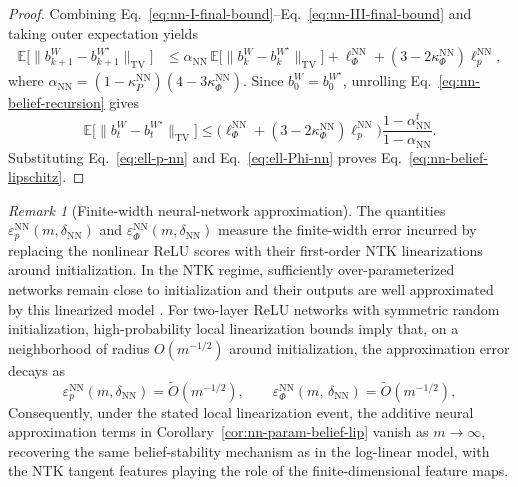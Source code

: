 \documentclass[10pt]{article} %
\theoremstyle{plain}
\theoremstyle{definition}
\theoremstyle{remark}
\newtheorem{remark}[theorem]{Remark}
\newcommand{\bE}{\mathbb{E}}
\begin{document}
\begin{proof}
Combining Eq.~\ref{eq:nn-I-final-bound}--Eq.~\ref{eq:nn-III-final-bound} and taking outer expectation yields
\begin{align}
\bE\Big[\|b_{k+1}^W-b_{k+1}^{W^\star}\|_{\mathrm{TV}}\Big]
&\le \alpha_{\mathrm{NN}}\,
\bE\Big[\|b_k^W-b_k^{W^\star}\|_{\mathrm{TV}}\Big]
+\ell_\Phi^{\mathrm{NN}}+(3-2\kappa_\Phi^{\mathrm{NN}})\ell_p^{\mathrm{NN}}, \label{eq:nn-belief-recursion}
\end{align}
where \(\alpha_{\mathrm{NN}}=(1-\kappa_P^{\mathrm{NN}})(4-3\kappa_\Phi^{\mathrm{NN}})\). Since \(b_0^W=b_0^{W^\star}\), unrolling Eq.~\ref{eq:nn-belief-recursion} gives
\[
\bE\Big[\|b_t^W-b_t^{W^\star}\|_{\mathrm{TV}}\Big]
\le \Big(\ell_\Phi^{\mathrm{NN}}+(3-2\kappa_\Phi^{\mathrm{NN}})\ell_p^{\mathrm{NN}}\Big)
\frac{1-\alpha_{\mathrm{NN}}^t}{1-\alpha_{\mathrm{NN}}}.
\]
Substituting Eq.~\ref{eq:ell-p-nn} and Eq.~\ref{eq:ell-Phi-nn} proves Eq.~\ref{eq:nn-belief-lipschitz}.
\end{proof}



\medskip

\begin{remark}[Finite-width neural-network approximation]
\label{rem:nn-linearization-error-rate}
The quantities \(\varepsilon_p^{\mathrm{NN}}(m, \delta_{\mathrm{NN}})\) and \(\varepsilon_\Phi^{\mathrm{NN}}(m, \delta_{\mathrm{NN}})\) measure the finite-width error incurred by replacing the nonlinear ReLU scores with their first-order NTK linearizations around initialization. In the NTK regime, sufficiently over-parameterized networks remain close to initialization and their outputs are well approximated by this linearized model \citep{JacotNTK2018,ChizatBach2019,JiLiTelgarsky2021}. For two-layer ReLU networks with symmetric random initialization, high-probability local linearization bounds imply that, on a neighborhood of radius \(O(m^{-1/2})\) around initialization, the approximation error decays as
\[
\varepsilon_p^{\mathrm{NN}}(m,\delta_{\mathrm{NN}})=\tilde O(m^{-1/2}),
\qquad \varepsilon_\Phi^{\mathrm{NN}}(m,\,\delta_{\mathrm{NN}})=\tilde O(m^{-1/2}),
\]
Consequently, under the stated local linearization event, the additive neural approximation terms in Corollary~\ref{cor:nn-param-belief-lip} vanish as \(m\to\infty\), recovering the same belief-stability mechanism as in the log-linear model, with the NTK tangent features playing the role of the finite-dimensional feature maps.
\end{remark}
\end{document}
